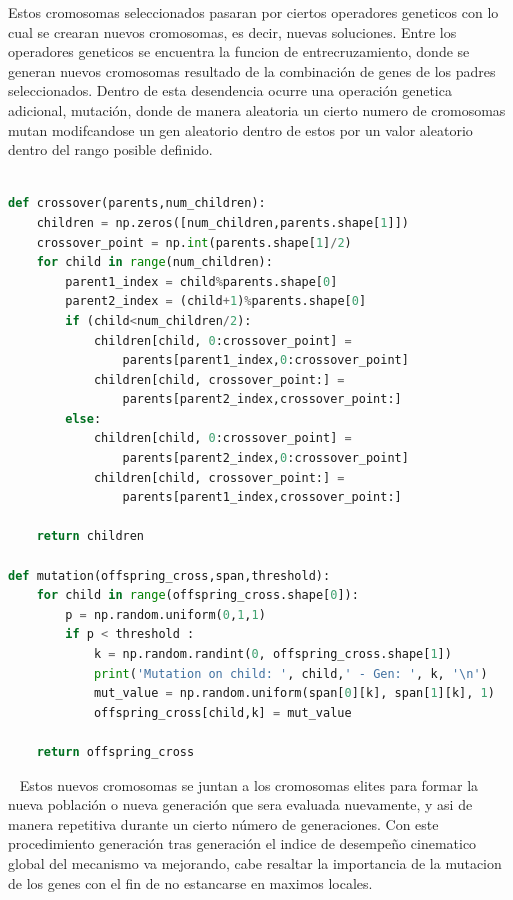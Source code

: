 Estos cromosomas seleccionados pasaran por ciertos operadores geneticos con lo cual se crearan nuevos cromosomas, es decir, nuevas soluciones. Entre los operadores geneticos se encuentra la funcion de entrecruzamiento, donde se generan nuevos cromosomas resultado de la combinación de genes de los padres seleccionados. Dentro de esta desendencia ocurre una operación genetica adicional, mutación, donde de manera aleatoria un cierto numero de cromosomas mutan modifcandose un gen aleatorio dentro de estos por un valor aleatorio dentro del rango posible definido.
~
\begin{lstlisting}[frame=single,language = python]  % Start your code-block

def crossover(parents,num_children):
    children = np.zeros([num_children,parents.shape[1]])
    crossover_point = np.int(parents.shape[1]/2)
    for child in range(num_children):  
        parent1_index = child%parents.shape[0]
        parent2_index = (child+1)%parents.shape[0]
        if (child<num_children/2):  
            children[child, 0:crossover_point] = 
                parents[parent1_index,0:crossover_point]
            children[child, crossover_point:] = 
                parents[parent2_index,crossover_point:]
        else:
            children[child, 0:crossover_point] = 
                parents[parent2_index,0:crossover_point]
            children[child, crossover_point:] = 
                parents[parent1_index,crossover_point:]

    return children

def mutation(offspring_cross,span,threshold):
    for child in range(offspring_cross.shape[0]):
        p = np.random.uniform(0,1,1)
        if p < threshold :
            k = np.random.randint(0, offspring_cross.shape[1])
            print('Mutation on child: ', child,' - Gen: ', k, '\n')
            mut_value = np.random.uniform(span[0][k], span[1][k], 1)
            offspring_cross[child,k] = mut_value
    
    return offspring_cross
\end{lstlisting}
~
Estos nuevos cromosomas se juntan a los cromosomas elites para formar la nueva población o nueva generación que sera evaluada nuevamente, y asi de manera repetitiva durante un cierto número de generaciones. Con este procedimiento generación tras generación el indice de desempeño cinematico global del mecanismo va mejorando, cabe resaltar la importancia de la mutacion de los genes con el fin de no estancarse en maximos locales.

